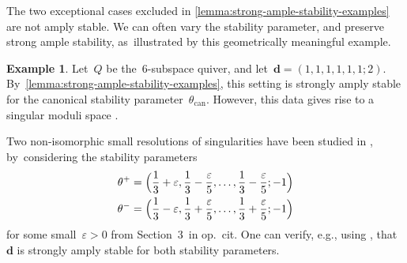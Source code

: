 \documentclass[JEP,XML,SOM,Unicode,NoEqCountersInSection,published]{cedram}
\let\epsilon\varepsilon
\theoremstyle{plain}
\theoremstyle{definition}
\newtheorem{example}[theorem]{Example}
\newcommand\can{\ensuremath{\mathrm{can}}}
\newcommand\tuple[1]{\ensuremath{{\boldsymbol{#1}}}}
\begin{document}
The two exceptional cases excluded in \cref{lemma:strong-ample-stability-examples}
are not amply stable.
We can often vary the stability parameter,
and preserve strong ample stability, as~illustrated by this geometrically meaningful example.
\begin{example}
Let~$Q$ be the~6-subspace quiver,
and let~$\tuple{d}=(1,1,1,1,1,1;2)$. By~\cref{lemma:strong-ample-stability-examples},
this setting is strongly amply stable for the canonical stability parameter~$\theta_\can$.
However, this data gives rise to a singular moduli space \cite{MR3778138,2202.08601}.

Two non-isomorphic small resolutions of singularities have been studied in \cite{MR3778138}, by~considering the stability parameters
\begin{equation*}
\begin{aligned}
\theta^+&=\Bigl( \frac{1}{3}+\epsilon,\frac{1}{3}-\frac{\epsilon}{5},\ldots,\frac{1}{3}-\frac{\epsilon}{5};-1 \Bigr) \\
\theta^-&=\Bigl( \frac{1}{3}-\epsilon,\frac{1}{3}+\frac{\epsilon}{5},\ldots,\frac{1}{3}+\frac{\epsilon}{5};-1 \Bigr)
\end{aligned}
\end{equation*}
for some small~$\epsilon>0$
from Section~3~in op.~cit.
One can verify, e.g., using \cite{quivertools},
that~$\tuple{d}$ is strongly amply stable for both stability parameters.
\end{example}
\end{document}
